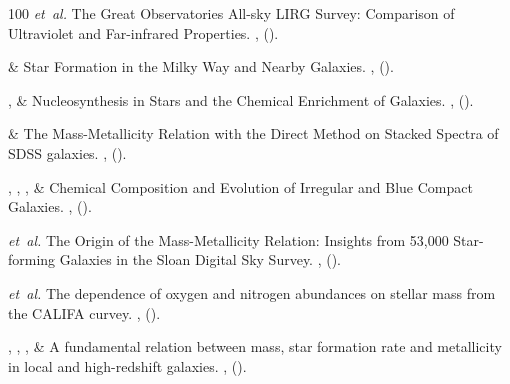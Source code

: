 \documentclass{nature2}
\begin{document}
\begin{thebibliography}{100}
\emph{et~al.}
\newblock The Great Observatories All-sky LIRG Survey: Comparison of Ultraviolet and Far-infrared Properties.
\newblock \emph{} \textbf{},
 ().

 \& 
\newblock Star Formation in the Milky Way and Nearby Galaxies.
\newblock \emph{} \textbf{},
 ().

,  \& 
\newblock Nucleosynthesis in Stars and the Chemical Enrichment of Galaxies.
\newblock \emph{} \textbf{},
 ().

 \& 
\newblock The Mass-Metallicity Relation with the Direct Method on Stacked Spectra of SDSS galaxies.
\newblock \emph{} \textbf{},
 ().

, , ,  \& 
\newblock Chemical Composition and Evolution of Irregular and Blue Compact Galaxies.
\newblock \emph{} \textbf{},
 ().

\emph{et~al.}
\newblock The Origin of the Mass-Metallicity Relation: Insights from 53,000 Star-forming Galaxies in the Sloan Digital Sky Survey.
\newblock \emph{} \textbf{},
 ().

\emph{et~al.}
\newblock The dependence of oxygen and nitrogen abundances on stellar mass from the CALIFA curvey.
\newblock \emph{} \textbf{},
 ().

, , ,  \& 
\newblock A fundamental relation between mass, star formation rate and metallicity in local and high-redshift galaxies.
\newblock \emph{} \textbf{},
 ().


\end{thebibliography}
\end{document}
